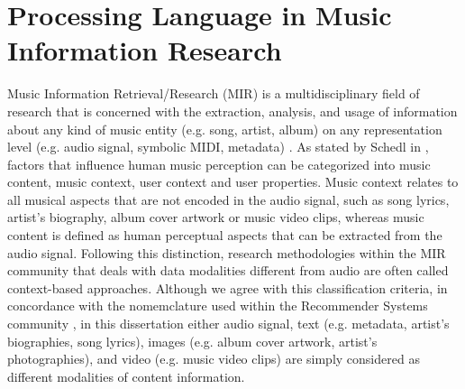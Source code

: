 

\section{Processing Language in Music Information Research}

Music Information Retrieval/Research (MIR) is a multidisciplinary field of research that is concerned with the extraction, analysis, and usage of information about any kind of music entity (e.g. song, artist, album) on any representation level (e.g. audio signal, symbolic MIDI, metadata) \cite{schedl2008}. As stated by Schedl in \cite{Schedl2013}, factors that influence human music perception can be categorized into music content, music context, user context and user properties. Music context relates to all musical aspects that are not encoded in the audio signal, such as song lyrics, artist's biography, album cover artwork or music video clips, whereas music content is defined as human perceptual aspects that can be extracted from the audio signal. Following this distinction, research methodologies within the MIR community that deals with data modalities different from audio are often called context-based approaches. 
Although we agree with this classification criteria, in concordance with the nomemclature used within the Recommender Systems community \cite{Ostuni2013}, in this dissertation either audio signal, text (e.g. metadata, artist's biographies, song lyrics), images (e.g. album cover artwork, artist's photographies), and video (e.g. music video clips) are simply considered as different modalities of content information.

